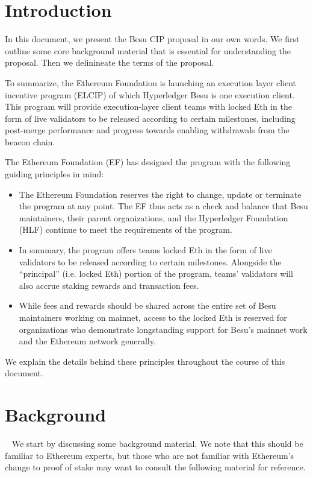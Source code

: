 
\section{Introduction} \label{sec:introduction}

In this document, we present the Besu CIP proposal in our own words.  We first outline some core background material that is essential for understanding the proposal.  Then we delinineate the terms of the proposal.

To summarize, the Ethereum Foundation is launching an execution layer client incentive program (ELCIP) of which Hyperledger Besu is one execution client. This program will provide execution-layer client teams with locked Eth in the form of live validators to be released according to certain milestones, including post-merge performance and progress towards enabling withdrawals from the beacon chain.

The Ethereum Foundation (EF) has designed the program with the following guiding principles in mind:

\begin{itemize}
\item The Ethereum Foundation reserves the right to change, update or terminate the program at any point. The EF thus acts as a check and balance that Besu maintainers, their parent organizations, and the Hyperledger Foundation (HLF) continue to meet the requirements of the program.
\item In summary, the program offers teams locked Eth in the form of live validators to be released according to certain milestones. Alongside the “principal” (i.e. locked Eth) portion of the program, teams’ validators will also accrue staking rewards and transaction fees.
\item While fees and rewards should be shared across the entire set of Besu maintainers working on mainnet, access to the locked Eth is reserved for organizations who demonstrate longstanding support for Besu’s mainnet work and the Ethereum network generally.
\end{itemize}
We explain the details behind these principles throughout the course of this document.

\section{Background}~\label{sec:background}
We start by discussing some background material.  We note that this should be familiar to Ethereum experts, but those who are not familiar with Ethereum's change to proof of stake may want to consult the following material for reference.

